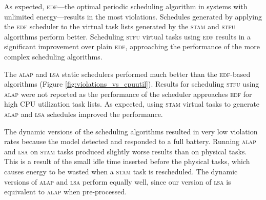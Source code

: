 
As expected, \textsc{edf}---the optimal periodic scheduling algorithm in systems with unlimited energy---results in the most violations.  Schedules generated by applying the \textsc{edf} scheduler to the virtual task lists generated by the \textsc{stam} and \textsc{stfu} algorithms perform better.  Scheduling \textsc{stfu} virtual tasks using \textsc{edf} results in a significant improvement over plain \textsc{edf}, approaching the performance of the more complex scheduling algorithms.



The \textsc{alap} and \textsc{lsa} static schedulers performed much better than the \textsc{edf}-based algorithms
(Figure \ref{fig:violations_vs_cpuutil}).
Results for scheduling \textsc{stfu} using \textsc{alap} were not reported as the performance of the scheduler 
approaches \textsc{edf} for high CPU utilization task lists.  
As expected, using \textsc{stam} virtual tasks to generate \textsc{alap} and \textsc{lsa} schedules improved the performance.  

The dynamic versions of the scheduling algorithms resulted in very low violation rates because the model detected 
and responded to a full battery.  Running \textsc{alap} and \textsc{lsa} on \textsc{stam} tasks produced slightly worse 
results than on physical tasks.  This is a result of the small idle time inserted before the physical tasks, 
which causes energy to be wasted when a \textsc{stam} task is rescheduled.
The dynamic versions of \textsc{alap} and \textsc{lsa} perform equally well, since our version of \textsc{lsa} is equivalent to \textsc{alap} when pre-processed. %

